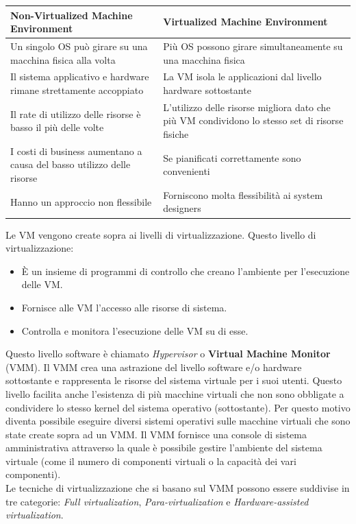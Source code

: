 \documentclass{article}
\begin{document}
\begin{table}[H]
    \begin{tabularx}{\linewidth}{X | X}
    \hline
    \textbf{Non-Virtualized Machine Environment} & \textbf{Virtualized Machine Environment}\\ [0.5ex]
    \hline\hline
    Un singolo OS può girare su una macchina fisica alla volta &
    Più OS possono girare simultaneamente su una macchina fisica \\
    \hline
    Il sistema applicativo e hardware rimane strettamente accoppiato &
    La VM isola le applicazioni dal livello hardware sottostante \\
    \hline
    Il rate di utilizzo delle risorse è basso il più delle volte & 
    L'utilizzo delle risorse migliora dato che più VM condividono lo stesso set di risorse fisiche \\
    \hline
    I costi di business aumentano a causa del basso utilizzo delle risorse & Se pianificati correttamente sono convenienti \\
    \hline
    Hanno un approccio non flessibile & 
    Forniscono molta flessibilità ai system designers\\ [1ex] 
    \hline
    \end{tabularx}
\end{table}
Le VM vengono create sopra ai livelli di virtualizzazione. Questo livello di virtualizzazione:
\begin{itemize}
    \item È un insieme di programmi di controllo che creano l'ambiente per l'esecuzione delle VM.
    \item Fornisce alle VM l'accesso alle risorse di sistema.
    \item Controlla e monitora l'esecuzione delle VM su di esse. 
\end{itemize}
Questo livello software è chiamato \textit{Hypervisor} o \textbf{Virtual Machine Monitor} (VMM). Il VMM crea una astrazione del livello software e/o hardware sottostante e rappresenta le risorse del sistema virtuale per i suoi utenti. Questo livello facilita anche l’esistenza di più macchine virtuali che non sono obbligate a condividere lo stesso kernel del sistema operativo (sottostante). Per questo motivo diventa possibile eseguire diversi sistemi operativi sulle macchine virtuali che sono state create sopra ad un VMM. Il VMM fornisce una console di sistema amministrativa attraverso la quale è possibile gestire l’ambiente del sistema virtuale (come il numero di componenti virtuali o la capacità dei vari componenti). \\
Le tecniche di virtualizzazione che si basano sul VMM possono essere suddivise in tre categorie: \textit{Full virtualization}, \textit{Para-virtualization} e \textit{Hardware-assisted virtualization}.
\end{document}
